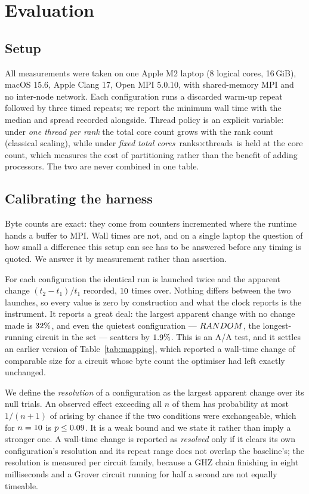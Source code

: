 \documentclass[11pt]{article}
\begin{document}
\section{Evaluation}

\subsection{Setup}

All measurements were taken on one Apple M2 laptop (8 logical cores, 16\,GiB),
macOS 15.6, Apple Clang 17, Open MPI 5.0.10, with shared-memory MPI and no
inter-node network. Each configuration runs a discarded warm-up repeat followed
by three timed repeats; we report the minimum wall time with the median and
spread recorded alongside. Thread policy is an explicit variable: under
\emph{one thread per rank} the total core count grows with the rank count
(classical scaling), while under \emph{fixed total cores} $\text{ranks} \times
\text{threads}$ is held at the core count, which measures the cost of
partitioning rather than the benefit of adding processors. The two are never
combined in one table.

\subsection{Calibrating the harness}
\label{sec:calibration}

Byte counts are exact: they come from counters incremented where the runtime
hands a buffer to MPI. Wall times are not, and on a single laptop the question
of how small a difference this setup can see has to be answered before any
timing is quoted. We answer it by measurement rather than assertion.

For each configuration the identical run is launched twice and the apparent
change $(t_2 - t_1)/t_1$ recorded, $10$ times over. Nothing
differs between the two launches, so every value is zero by construction and
what the clock reports is the instrument. It reports a great deal: the largest
apparent change with no change made is $32\%$, and even the
quietest configuration --- $RANDOM$, the longest-running
circuit in the set --- scatters by $1.9\%$. This is an A/A test, and
it settles an earlier version of Table~\ref{tab:mapping}, which reported a
wall-time change of comparable size for a circuit whose byte count the
optimiser had left exactly unchanged.

We define the \emph{resolution} of a configuration as the largest apparent
change over its null trials. An observed effect exceeding all $n$ of them has
probability at most $1/(n+1)$ of arising by chance if the two conditions were
exchangeable, which for $n = 10$ is $p \le
0.09$. It is a weak bound and we state it rather than imply a
stronger one. A wall-time change is reported as \emph{resolved} only if it
clears its own configuration's resolution and its repeat range does not
overlap the baseline's; the resolution is measured per circuit family, because
a GHZ chain finishing in eight milliseconds and a Grover circuit running for
half a second are not equally timeable.
\end{document}
